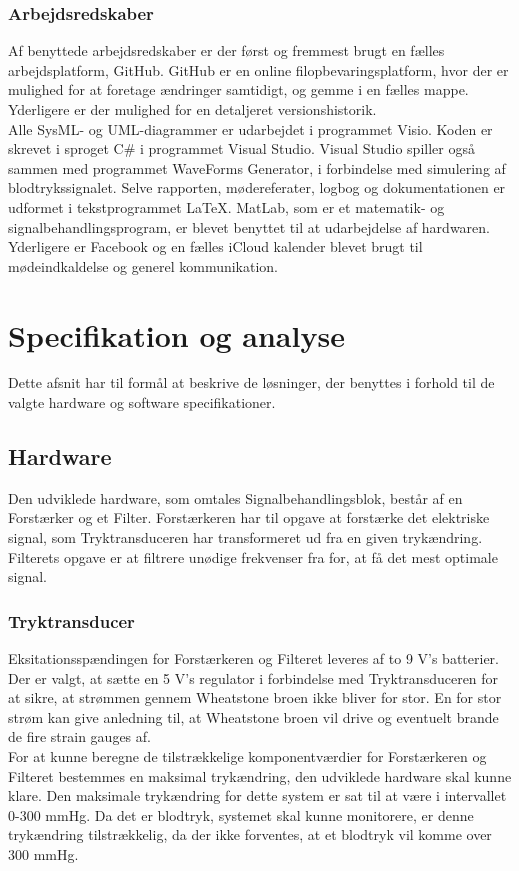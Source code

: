 \subsubsection{Arbejdsredskaber} 
Af benyttede arbejdsredskaber er der først og fremmest brugt en fælles arbejdsplatform, GitHub. GitHub er en online filopbevaringsplatform, hvor der er mulighed for at foretage ændringer samtidigt, og gemme i en fælles mappe. Yderligere er der mulighed for en detaljeret versionshistorik.\\
Alle SysML- og UML-diagrammer er udarbejdet i programmet Visio. Koden er skrevet i sproget C\# i programmet Visual Studio. Visual Studio spiller også sammen med programmet WaveForms Generator, i forbindelse med simulering af blodtrykssignalet. Selve rapporten, mødereferater, logbog og dokumentationen er udformet i tekstprogrammet LaTeX. MatLab, som er et matematik- og signalbehandlingsprogram, er blevet benyttet til at udarbejdelse af hardwaren. Yderligere er Facebook og en fælles iCloud kalender blevet brugt til mødeindkaldelse og generel kommunikation.

\section{Specifikation og analyse}
Dette afsnit har til formål at beskrive de løsninger, der benyttes i forhold til de valgte hardware og software specifikationer. 

\subsection{Hardware}
Den udviklede hardware, som omtales Signalbehandlingsblok, består af en Forstærker og et Filter. Forstærkeren har til opgave at forstærke det elektriske signal, som Tryktransduceren har transformeret ud fra en given trykændring. Filterets opgave er at filtrere unødige frekvenser fra for, at få det mest optimale signal.

\subsubsection{Tryktransducer}
Eksitationsspændingen for Forstærkeren og Filteret leveres af to 9 V's batterier. Der er valgt, at sætte en 5 V's regulator i forbindelse med Tryktransduceren for at sikre, at strømmen gennem Wheatstone broen ikke bliver for stor. En for stor strøm kan give anledning til, at Wheatstone broen vil drive og eventuelt brande de fire strain gauges af.\\
For at kunne beregne de tilstrækkelige komponentværdier for Forstærkeren og Filteret bestemmes en maksimal trykændring, den udviklede hardware skal kunne klare. Den maksimale trykændring for dette system er sat til at være i intervallet 0-300 mmHg. Da det er blodtryk, systemet skal kunne monitorere, er denne trykændring tilstrækkelig, da der ikke forventes, at et blodtryk vil komme over 300 mmHg.

